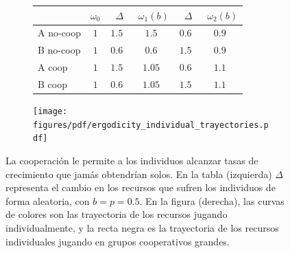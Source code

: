 \documentclass[a4paper,11pt]{book}
\theoremstyle{definition}
\begin{document}
\begin{figure}[ht!]
\vspace{-0.1cm}
\centering
 \begin{subfigure}[c]{0.50\textwidth}
 \centering
  \begin{tabular}{|l|c|c|c|c|c|}
     \hline
         & {\small $\omega_0$} & {\small \  $\Delta$}  & {\small \, $\omega_1(b)$ } & {\small \  $\Delta$}  & {\small \,  $\omega_2(b)$ }  \\ \hline \hline
        A no-coop& $1$ & $1.5$ &  $1.5$ & $0.6$ & $\bm{0.9}$ \\ \hline
        B no-coop & $1$ & $0.6$ & $0.6$ & $1.5$ & $\bm{0.9}$ \\ \hline\hline
        A coop & $1$ & $1.5$ & $1.05$ & $0.6$ & $\bm{1.1}$ \\ \hline
        B coop & $1$ & $0.6$ & $1.05$ & $1.5$ & $\bm{1.1}$\\ \hline
\end{tabular}
 \end{subfigure}
 \begin{subfigure}[c]{0.45\textwidth}
\begin{flushright}
 \texttt{[image: figures/pdf/ergodicity\_individual\_trayectories.pdf]}
 \end{flushright}
 \end{subfigure}
 \caption{
 La cooperación le permite a los individuos alcanzar tasas de crecimiento que jamás obtendrían solos.
 En la tabla (izquierda) $\Delta$ representa el cambio en los recursos que sufren los individuos de forma aleatoria, con $b=p=0.5$.
 En la figura (derecha), las curvas de colores son las trayectoria de los recursos jugando individualmente, y la recta negra es la trayectoria de los recursos individuales jugando en grupos cooperativos grandes.
 }
 \label{fig:coop}
 \vspace{-0.1cm}
 \end{figure}

\end{document}
